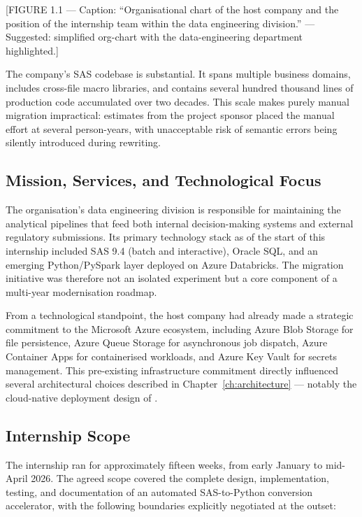 [FIGURE 1.1 --- Caption: ``Organisational chart of the host company and the
position of the internship team within the data engineering division.'' ---
Suggested: simplified org-chart with the data-engineering department
highlighted.]

The company's \ac{SAS} codebase is substantial. It spans multiple business
domains, includes cross-file macro libraries, and contains several hundred
thousand lines of production code accumulated over two decades. This scale
makes purely manual migration impractical: estimates from the project sponsor
placed the manual effort at several person-years, with unacceptable risk of
semantic errors being silently introduced during rewriting.

\subsection{Mission, Services, and Technological Focus}
\label{subsec:mission-vision}

The organisation's data engineering division is responsible for maintaining the
analytical pipelines that feed both internal decision-making systems and
external regulatory submissions. Its primary technology stack as of the start of
this internship included SAS 9.4 (batch and interactive), Oracle SQL, and an
emerging Python/PySpark layer deployed on Azure Databricks. The migration
initiative was therefore not an isolated experiment but a core component of a
multi-year modernisation roadmap.

From a technological standpoint, the host company had already made a strategic
commitment to the Microsoft Azure ecosystem, including Azure Blob Storage for
file persistence, Azure Queue Storage for asynchronous job dispatch, Azure
Container Apps for containerised workloads, and Azure Key Vault for secrets
management. This pre-existing infrastructure commitment directly influenced
several architectural choices described in Chapter~\ref{ch:architecture} ---
notably the cloud-native deployment design of \codara{}.

\subsection{Internship Scope}
\label{subsec:internship-scope}

The internship ran for approximately fifteen weeks, from early January to
mid-April 2026. The agreed scope covered the complete design, implementation,
testing, and documentation of an automated SAS-to-Python conversion accelerator,
with the following boundaries explicitly negotiated at the outset:


